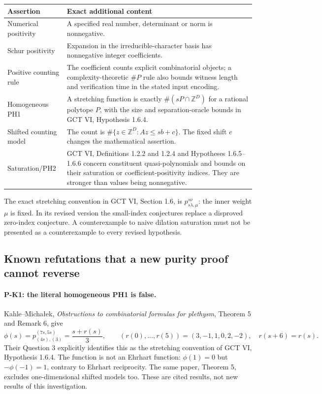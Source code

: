 \documentclass[11pt,a4paper]{article}
\begin{document}
\begin{center}\small
\begin{tabularx}{\linewidth}{@{}p{.18\linewidth}X@{}}
\toprule
Assertion & Exact additional content\\
\midrule
Numerical positivity & A specified real number, determinant or norm is nonnegative.\\
Schur positivity & Expansion in the irreducible-character basis has
nonnegative integer coefficients.\\
Positive counting rule & The coefficient counts explicit combinatorial
objects; a complexity-theoretic $\#P$ rule also bounds witness length and
verification time in the stated input encoding.\\
Homogeneous PH1 & A stretching function is exactly
$\#(sP\cap\mathbb Z^D)$ for a rational polytope $P$, with the size and
separation-oracle bounds in GCT VI, Hypothesis 1.6.4.\\
Shifted counting model & The count is $\#\{z\in\mathbb Z^D:Az\le sb+c\}$.
The fixed shift $c$ changes the mathematical assertion.\\
Saturation/PH2 & GCT VI, Definitions 1.2.2 and 1.2.4 and
Hypotheses 1.6.5--1.6.6 concern constituent quasi-polynomials and bounds
on their saturation or coefficient-positivity indices. They are stronger
than values being nonnegative.\\
\bottomrule
\end{tabularx}
\end{center}

The exact stretching convention in GCT VI, Section 1.6, is
$p_{s\lambda,\mu}^{s\nu}$: the inner weight $\mu$ is fixed.
In its revised version the small-index conjectures replace a disproved
zero-index conjecture. A counterexample to naive dilation saturation must
not be presented as a counterexample to every revised hypothesis.

\subsection{Known refutations that a new purity proof cannot reverse}
\paragraph{P-K1: the literal homogeneous PH1 is false.}
Kahle--Micha\l ek, \emph{Obstructions to combinatorial formulas for
plethysm}, Theorem 5 and Remark 6, give
\[
 \phi(s)=p_{(4s),(3)}^{(7s,5s)}
 =\frac{s+r(s)}3,\qquad
 (r(0),\ldots,r(5))=(3,-1,1,0,2,-2),
 \quad r(s+6)=r(s).
 \tag{P-K1}\label{eq:km}
\]
Their Question 3 explicitly identifies this as the stretching convention
of GCT VI, Hypothesis 1.6.4. The function is not an Ehrhart function:
$\phi(1)=0$ but $-\phi(-1)=1$, contrary to Ehrhart reciprocity.
The same paper, Theorem 5, excludes one-dimensional shifted models too.
These are cited results, not new results of this investigation.
\end{document}
